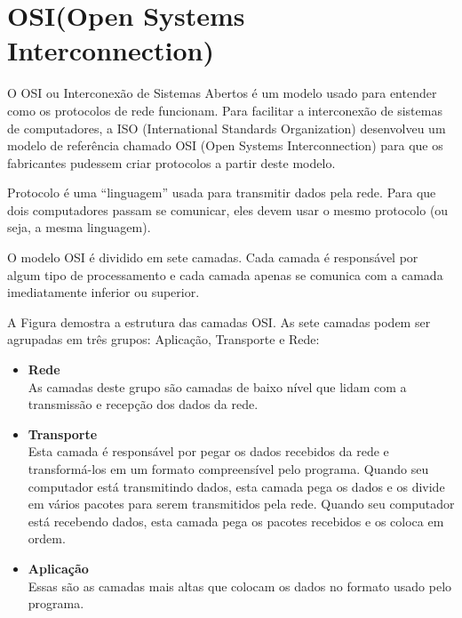 \section{OSI(Open Systems Interconnection)}

O OSI  ou Interconexão de Sistemas Abertos é um modelo usado para entender como os protocolos de rede funcionam. Para facilitar a interconexão de sistemas de computadores, a ISO (International Standards Organization) desenvolveu um modelo de referência chamado OSI (Open Systems Interconnection) para que os fabricantes pudessem criar protocolos a partir deste modelo. %

Protocolo é uma “linguagem” usada para transmitir dados pela rede. Para que dois computadores passam se comunicar, eles devem usar o mesmo protocolo (ou seja, a mesma linguagem).

O modelo OSI é dividido em sete camadas. Cada camada é responsável por algum tipo de processamento e cada camada apenas se comunica com a camada imediatamente inferior ou superior.%


A Figura demostra a estrutura das camadas OSI. As sete camadas podem ser agrupadas em três grupos: Aplicação, Transporte e Rede:

\begin{itemize}
 \item \textbf{{Rede}} \\
	As camadas deste grupo são camadas de baixo nível que lidam com a transmissão e recepção dos dados da rede.
 \item \textbf{{Transporte}} \\
	Esta camada é responsável por pegar os dados recebidos da rede e transformá-los em um formato compreensível pelo programa. Quando seu computador está transmitindo dados, esta camada pega os dados e os divide em vários pacotes para serem transmitidos pela rede. Quando seu computador está recebendo dados, esta camada pega os pacotes recebidos e os coloca em ordem.
 \item \textbf{{Aplicação}} \\
	Essas são as camadas mais altas que colocam os dados no formato usado pelo programa.
\end{itemize}

